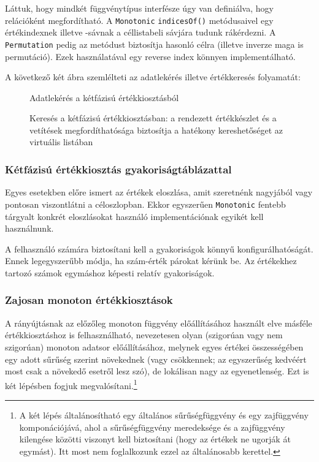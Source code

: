 \documentclass[
    parspace,
    noindent,
    nohyp,
]{elteiktdk}[2023/04/10]
\begin{document}
Láttuk, hogy mindkét függvénytípus interfésze úgy van definiálva, hogy relációként megfordítható.
A \texttt{Monotonic} \texttt{indicesOf()} metódusaivel egy értékindexnek illetve -sávnak
a céllistabeli sávjára tudunk rákérdezni.
A \texttt{Permutation} pedig az  metódust biztosítja hasonló célra
(illetve inverze maga is permutáció).
Ezek használatával egy reverse index könnyen implementálható.

A következő két ábra szemlélteti az adatlekérés illetve értékkeresés folyamatát:

\begin{figure}[H]
  \centering
  \hspace*{\fill}
  \begin{minipage}[t]{0.42\textwidth}
    
    \caption{Adatlekérés a kétfázisú értékkiosztásból}
  \end{minipage}
  \hspace*{\fill}
  \begin{minipage}[t]{0.42\textwidth}
    
    \caption{
      Keresés a kétfázisú értékkiosztásban:
      a rendezett értékkészlet és a vetítések megfordíthatósága
      biztosítja a hatékony kereshetőséget az virtuális listában
    }
  \end{minipage}
  \hspace*{\fill}
\end{figure}

\subsubsection{Kétfázisú értékkiosztás gyakoriságtáblázattal}

Egyes esetekben előre ismert az értékek eloszlása,
amit szeretnénk nagyjából vagy pontosan viszontlátni a céloszlopban.
Ekkor egyszerűen \texttt{Monotonic} fentebb tárgyalt konkrét eloszlásokat használó
implementációnak egyikét kell használnunk.

A felhasználó számára biztosítani kell a gyakoriságok könnyű konfigurálhatóságát.
Ennek legegyszerűbb módja, ha szám-érték párokat kérünk be.
Az értékekhez tartozó számok egymáshoz képesti relatív gyakoriságok.

\subsubsection{Zajosan monoton értékkiosztások}

A rányújtásnak az előzőleg monoton függvény előállításához használt elve
másféle értékkiosztáshoz is felhasználható,
nevezetesen olyan (szigorúan vagy nem szigorúan) monoton adatsor előállításához,
melynek egyes értékei összességében egy adott sűrűség szerint növekednek
(vagy csökkennek; az egyszerűség kedvéért most csak a növekedő esetről lesz szó),
de lokálisan nagy az egyenetlenség.
Ezt is két lépésben fogjuk megvalósítani.\footnote{
  A két lépés általánosítható egy általános sűrűségfüggvény és egy zajfüggvény komponációjává,
  ahol a sűrűségfüggvény meredeksége és a zajfüggvény kilengése közötti viszonyt kell biztosítani
  (hogy az értékek ne ugorják át egymást).
  Itt most nem foglalkozunk ezzel az általánosabb kerettel.
}
\end{document}

